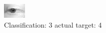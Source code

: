\begin{figure}[h!]
\begin{center}
\includegraphics[width=0.60\columnwidth]{figures/ID2697_class_3_target_4.png}
\end{center}
\caption{ Classification: 3 actual target: 4}
\label{fig:ID2697_class_3_target_4}
\end{figure}
